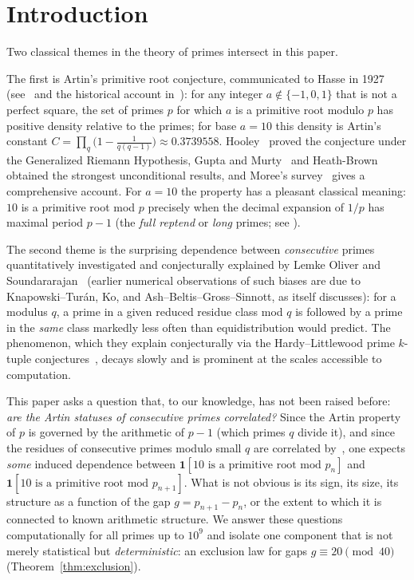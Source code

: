 \documentclass[11pt]{amsart}
\theoremstyle{definition}
\begin{document}
\maketitle

\section{Introduction}
\label{sec:intro}

Two classical themes in the theory of primes intersect in this paper.

The first is Artin's primitive root conjecture, communicated to Hasse in 1927
(see~\cite{Artin1965} and the historical account in~\cite{Moree2012}): for any integer
$a \notin \{-1, 0, 1\}$ that is not a perfect square, the set of primes $p$ for
which $a$ is a primitive root modulo $p$ has positive density relative to
the primes; for base
$a = 10$ this density is Artin's constant
$C = \prod_q \bigl(1 - \tfrac{1}{q(q-1)}\bigr) \approx 0.3739558$.
Hooley~\cite{Hooley1967} proved the conjecture under the Generalized Riemann
Hypothesis, Gupta and Murty~\cite{GuptaMurty1984} and
Heath-Brown~\cite{HeathBrown1986} obtained the strongest unconditional
results, and Moree's survey~\cite{Moree2012} gives a comprehensive account.
For $a = 10$ the property has a pleasant classical meaning: $10$ is a primitive
root mod $p$ precisely when the decimal expansion of $1/p$ has maximal period
$p - 1$ (the \emph{full reptend} or \emph{long} primes; see
\cite[pp.~166--171]{ConwayGuy1996}).

The second theme is the surprising dependence between \emph{consecutive}
primes quantitatively investigated and conjecturally explained by Lemke Oliver
and Soundararajan~\cite{LOS2016} (earlier numerical observations of such
biases are due to Knapowski--Tur\'an, Ko, and Ash--Beltis--Gross--Sinnott, as
\cite{LOS2016} itself discusses): for a
modulus $q$, a prime in a given reduced residue class mod $q$ is followed by a
prime in the \emph{same} class markedly less often than equidistribution would
predict. The phenomenon, which they explain conjecturally via the
Hardy--Littlewood prime $k$-tuple conjectures~\cite{HardyLittlewood1923}, decays
slowly and is prominent at the scales accessible to computation.

This paper asks a question that, to our knowledge, has not been raised before:
\emph{are the Artin statuses of consecutive primes correlated?} Since the
Artin property of $p$ is governed by the arithmetic of $p - 1$ (which primes
$q$ divide it), and since the residues of consecutive primes modulo small $q$
are correlated by~\cite{LOS2016}, one expects \emph{some} induced dependence
between $\mathbf{1}[10 \text{ is a primitive root mod } p_n]$ and
$\mathbf{1}[10 \text{ is a primitive root mod } p_{n+1}]$. What is not obvious
is its sign, its size, its structure as a function of the gap
$g = p_{n+1} - p_n$, or the extent to which it is connected to known
arithmetic structure. We answer these questions computationally for all primes up to
$10^9$ and isolate one component that is not merely statistical but
\emph{deterministic}: an exclusion law for gaps $g \equiv 20 \pmod{40}$
(Theorem~\ref{thm:exclusion}).
\end{document}
